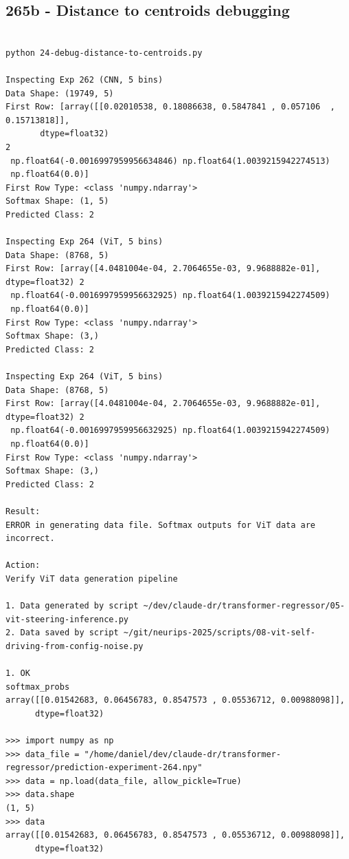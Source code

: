 \subsection{265b - Distance to centroids debugging}
\label{app_res:265b}

\begin{verbatim}

python 24-debug-distance-to-centroids.py

Inspecting Exp 262 (CNN, 5 bins)
Data Shape: (19749, 5)
First Row: [array([[0.02010538, 0.18086638, 0.5847841 , 0.057106  , 0.15713818]],
       dtype=float32)                                                  2
 np.float64(-0.0016997959956634846) np.float64(1.0039215942274513)
 np.float64(0.0)]
First Row Type: <class 'numpy.ndarray'>
Softmax Shape: (1, 5)
Predicted Class: 2

Inspecting Exp 264 (ViT, 5 bins)
Data Shape: (8768, 5)
First Row: [array([4.0481004e-04, 2.7064655e-03, 9.9688882e-01], dtype=float32) 2
 np.float64(-0.0016997959956632925) np.float64(1.0039215942274509)
 np.float64(0.0)]
First Row Type: <class 'numpy.ndarray'>
Softmax Shape: (3,)
Predicted Class: 2

Inspecting Exp 264 (ViT, 5 bins)
Data Shape: (8768, 5)
First Row: [array([4.0481004e-04, 2.7064655e-03, 9.9688882e-01], dtype=float32) 2
 np.float64(-0.0016997959956632925) np.float64(1.0039215942274509)
 np.float64(0.0)]
First Row Type: <class 'numpy.ndarray'>
Softmax Shape: (3,)
Predicted Class: 2

Result:
ERROR in generating data file. Softmax outputs for ViT data are incorrect.

Action:
Verify ViT data generation pipeline 

1. Data generated by script ~/dev/claude-dr/transformer-regressor/05-vit-steering-inference.py 
2. Data saved by script ~/git/neurips-2025/scripts/08-vit-self-driving-from-config-noise.py

1. OK
softmax_probs
array([[0.01542683, 0.06456783, 0.8547573 , 0.05536712, 0.00988098]],
      dtype=float32)
      
>>> import numpy as np
>>> data_file = "/home/daniel/dev/claude-dr/transformer-regressor/prediction-experiment-264.npy"
>>> data = np.load(data_file, allow_pickle=True)
>>> data.shape
(1, 5)
>>> data
array([[0.01542683, 0.06456783, 0.8547573 , 0.05536712, 0.00988098]],
      dtype=float32)


\end{verbatim}
